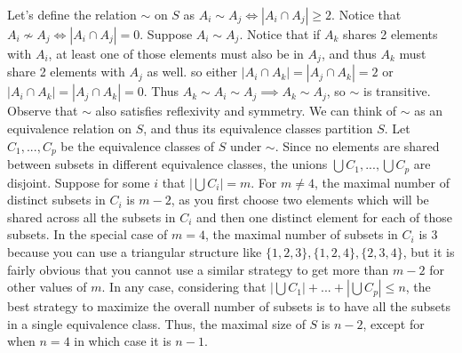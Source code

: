\begin{enumerate}
 Let's define the relation $\sim$ on $S$ as $A_i \sim A_j \iff |A_i \cap A_j| \ge 2$. Notice that $A_i \not\sim A_j \iff |A_i \cap A_j| = 0$. Suppose $A_i \sim A_j$. Notice that if $A_k$ shares 2 elements with $A_i$, at least one of those elements must also be in $A_j$, and thus $A_k$ must share 2 elements with $A_j$ as well. so either $|A_i \cap A_k| = |A_j \cap A_k| = 2$ or $|A_i \cap A_k| = |A_j \cap A_k| = 0$. Thus $A_k \sim A_i \sim A_j \implies A_k \sim A_j$, so $\sim$ is transitive. Observe that $\sim$ also satisfies reflexivity and symmetry. We can think of $\sim$ as an equivalence relation on $S$, and thus its equivalence classes partition $S$. Let $C_1,...,C_p$ be the equivalence classes of $S$ under $\sim$. Since no elements are shared between subsets in different equivalence classes, the unions $\bigcup C_1,..., \bigcup C_p$ are disjoint. Suppose for some $i$ that $|\bigcup C_i| = m$. For $m\neq 4$, the maximal number of distinct subsets in $C_i$ is $m-2$, as you first choose two elements which will be shared across all the subsets in $C_i$ and then one distinct element for each of those subsets. In the special case of $m=4$, the maximal number of subsets in $C_i$ is 3 because you can use a triangular structure like $\{1,2,3\}, \{1,2,4\}, \{2,3,4\}$, but it is fairly obvious that you cannot use a similar strategy to get more than $m-2$ for other values of $m$. In any case, considering that $|\bigcup C_1| + ... + |\bigcup C_p| \leq n$, the best strategy to maximize the overall number of subsets is to have all the subsets in a single equivalence class. Thus, the maximal size of $S$ is $n-2$, except for when $n=4$ in which case it is $n-1$.

 


\end{enumerate}